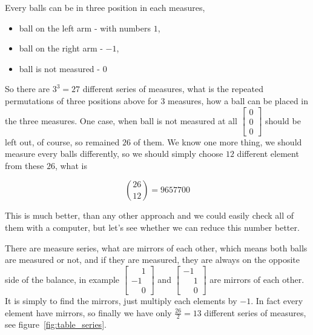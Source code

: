 \documentclass[11pt]{article} %
\begin{document}
Every balls can be in three position in each measures,
\begin{itemize}
\item ball on the left arm - with numbers $1$,
\item ball on the right arm - $-1$,
\item ball is not measured - $0$
\end{itemize}
So there are $3^3 = 27$ different series of measures, what is the repeated permutations of three positions above for $3$ measures, how a ball can be placed in the three measures. One case, when ball is not measured at all $\left[\begin{smallmatrix}0\\0\\0\end{smallmatrix}\right]$ should be left out, of course, so remained $26$ of them. We know one more thing, we should measure every balls differently, so we should simply choose $12$ different element from these $26$, what is

\[ \binom{26}{12} = 9657700 \]

This is much better, than any other approach and we could easily check all of them with a computer, but let's see whether we can reduce this number better.

There are measure series, what are mirrors of each other, which means both balls are measured or not, and if they are measured, they are always on the opposite side of the balance, in example $\left[\begin{smallmatrix}\phantom{{}-{}}1\\-1\\\phantom{{}-{}}0\end{smallmatrix}\right]$ and $\left[\begin{smallmatrix}-1\\\phantom{{}-{}}1\\\phantom{{}-{}}0\end{smallmatrix}\right]$ are mirrors of each other. It is simply to find the mirrors, just multiply each elements by $-1$. In fact every element have mirrors, so finally we have only $\frac{26}{2} = 13$ different series of measures, see figure~\ref{fig:table_series}.
\end{document}
